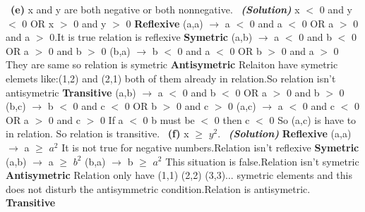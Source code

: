 \documentclass[a4 paper]{article}
\numberwithin{equation}{section}
\newcommand{\subproblem}[1]{~\newline\textbf{(#1)}}
\newcommand{\solution}{~\newline\textbf{\textit{(Solution)}} }
\newcommand{\0}{\mathbf{0}}
\begin{document}
\subproblem{e} x and y are both negative or both nonnegative.
\solution
\newline
x $<$ 0 and y $<$ 0 OR  x $>$ 0 and y $>$ 0\newline
\textbf{Reflexive}\newline
(a,a) $\rightarrow$ a $<$ 0 and a $<$ 0 OR  a $>$ 0 and a $>$ 0.It is true relation is reflexive\newline 
\textbf{Symetric}\newline
(a,b) $\rightarrow$ a $<$ 0 and b $<$ 0 OR  a $>$ 0 and b $>$ 0\newline
(b,a) $\rightarrow$ b $<$ 0 and a $<$ 0 OR  b $>$ 0 and a $>$ 0\newline
They are same so relation is symetric\newline
\textbf{Antisymetric}\newline
Relaiton have symetric elemets like:(1,2) and (2,1) both of them already in relation.So relation isn't antisymetric\newline
\textbf{Transitive}\newline
(a,b) $\rightarrow$ a $<$ 0 and b $<$ 0 OR  a $>$ 0 and b $>$ 0\newline
(b,c) $\rightarrow$ b $<$ 0 and c $<$ 0 OR  b $>$ 0 and c $>$ 0\newline
(a,c) $\rightarrow$ a $<$ 0 and c $<$ 0 OR  a $>$ 0 and c $>$ 0\newline
If a $<$ 0 b must be $<$ 0 then c $<$ 0 So (a,c) is have to in relation.\newline
So relation is transitive.\newline
\newline
\subproblem{f} x $\geq$ $y^2$.
\solution
\newline
\textbf{Reflexive}\newline
(a,a) $\rightarrow$ a $\geq$ $a^2$ It is not true for negative numbers.Relation isn't reflexive\newline
\textbf{Symetric}\newline
(a,b) $\rightarrow$ a $\geq$ $b^2$ \newline
(b,a) $\rightarrow$ b $\geq$ $a^2$ This situation is false.Relation isn't symetric\newline 
\textbf{Antisymetric}\newline
Relation only have (1,1) (2,2) (3,3)... symetric elements and this does not disturb the antisymmetric condition.Relation is antisymetric.\newline
\newline
\textbf{Transitive}\newline
\end{document}
